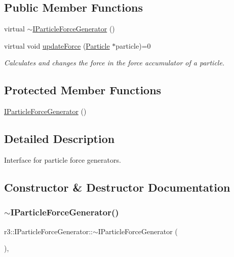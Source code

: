 \subsection*{Public Member Functions}
\begin{DoxyCompactItemize}
\item 
virtual \mbox{\hyperlink{classr3_1_1_i_particle_force_generator_a1682bcec51cd294cbef8b6cbd4f50266}{$\sim$\+I\+Particle\+Force\+Generator}} ()
\item 
virtual void \mbox{\hyperlink{classr3_1_1_i_particle_force_generator_af705063c5d7debca0f7a5c5c68c28f50}{update\+Force}} (\mbox{\hyperlink{classr3_1_1_particle}{Particle}} $\ast$particle)=0
\begin{DoxyCompactList}\small\item\em Calculates and changes the force in the force accumulator of a particle. \end{DoxyCompactList}\end{DoxyCompactItemize}
\subsection*{Protected Member Functions}
\begin{DoxyCompactItemize}
\item 
\mbox{\hyperlink{classr3_1_1_i_particle_force_generator_a919ae235883c736232741d947fd9a708}{I\+Particle\+Force\+Generator}} ()
\end{DoxyCompactItemize}


\subsection{Detailed Description}
Interface for particle force generators. 

\subsection{Constructor \& Destructor Documentation}
\mbox{\label{classr3_1_1_i_particle_force_generator_a1682bcec51cd294cbef8b6cbd4f50266}} 
\subsubsection{\texorpdfstring{$\sim$\+I\+Particle\+Force\+Generator()}{~IParticleForceGenerator()}}
{\footnotesize\ttfamily r3\+::\+I\+Particle\+Force\+Generator\+::$\sim$\+I\+Particle\+Force\+Generator (\begin{DoxyParamCaption}{ }\end{DoxyParamCaption})\hspace{0.3cm}{\ttfamily [virtual]}, {\ttfamily [default]}}

